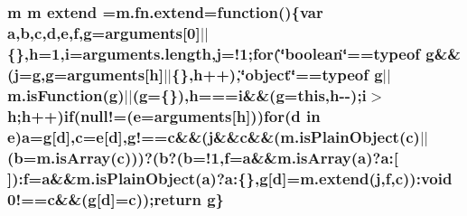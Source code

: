 \subsubsection[{extend}]{\setlength{\rightskip}{0pt plus 5cm}m m extend =m.\+fn.\+extend=function()\{var {\bf a},{\bf b},{\bf c},{\bf d},{\bf e},f,g=arguments\mbox{[}0\mbox{]}$\vert$$\vert$\{\},h=1,i=arguments.\+length,j=!1;{\bf for}(\char`\"{}boolean\char`\"{}==typeof g\&\&(j=g,g=arguments\mbox{[}h\mbox{]}$\vert$$\vert$\{\},h++),\char`\"{}object\char`\"{}==typeof g$\vert$$\vert$m.\+is\+Function(g)$\vert$$\vert$(g=\{\}),h===i\&\&(g=this,h-\/-\/);i$>$h;h++){\bf if}(null!=({\bf e}=arguments\mbox{[}h\mbox{]})){\bf for}({\bf d} in {\bf e}){\bf a}=g\mbox{[}{\bf d}\mbox{]},{\bf c}={\bf e}\mbox{[}{\bf d}\mbox{]},g!=={\bf c}\&\&(j\&\&{\bf c}\&\&(m.\+is\+Plain\+Object({\bf c})$\vert$$\vert$({\bf b}=m.\+is\+Array({\bf c})))?({\bf b}?({\bf b}=!1,f={\bf a}\&\&m.\+is\+Array({\bf a})?a\+:\mbox{[}$\,$\mbox{]})\+:f={\bf a}\&\&m.\+is\+Plain\+Object({\bf a})?a\+:\{\},g\mbox{[}{\bf d}\mbox{]}=m.\+extend(j,f,{\bf c}))\+:void 0!=={\bf c}\&\&(g\mbox{[}{\bf d}\mbox{]}={\bf c}));return g\}}\label{_admin_2application_2assets_2js_2jquery-1_811_82_8min_8js_a167947be5252c14d5389d8a01a8c8545}
\hypertarget{_admin_2application_2assets_2js_2jquery-1_811_82_8min_8js_ab2836ee14921cbd6e34ea91a9a99ad66}{}
